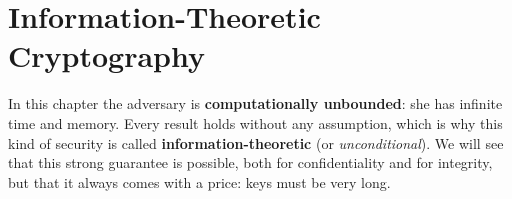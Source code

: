 \chapter{Information-Theoretic Cryptography}

In this chapter the adversary is \textbf{computationally unbounded}: she has infinite time and memory. Every result holds without any assumption, which is why this kind of security is called \textbf{information-theoretic} (or \textit{unconditional}). We will see that this strong guarantee is possible, both for confidentiality and for integrity, but that it always comes with a price: keys must be very long.




